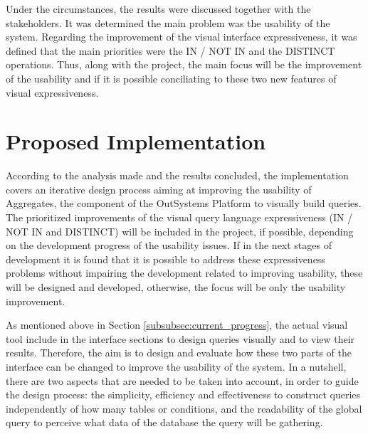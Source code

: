 Under the circumstances, the results were discussed together with the stakeholders. It was determined the main problem was the usability of the system. Regarding the improvement of the visual interface expressiveness, it was defined that the main priorities were the IN / NOT IN and the DISTINCT operations. Thus, along with the project, the main focus will be the improvement of the usability and if it is possible conciliating to these two new features of visual expressiveness.

\section{Proposed Implementation}
\label{sec:proposed_implementation}
According to the analysis made and the results concluded, the implementation covers an iterative design process aiming at improving the usability of Aggregates, the component of the OutSystems Platform to visually build queries. The prioritized improvements of the visual query language expressiveness (IN / NOT IN and DISTINCT) will be included in the project, if possible, depending on the development progress of the usability issues. If in the next stages of development it is found that it is possible to address these expressiveness problems without impairing the development related to improving usability, these will be designed and developed, otherwise, the focus will be only the usability improvement. %

As mentioned above in Section \ref{subsubsec:current_progress}, the actual visual tool include in the interface sections to design queries visually and to view their results. Therefore, the aim is to design and evaluate how these two parts of the interface can be changed to improve the usability of the system. In a nutshell, there are two aspects that are needed to be taken into account, in order to guide the design process: the simplicity, efficiency and effectiveness to construct queries independently of how many tables or conditions, and the readability of the global query to perceive what data of the database the query will be gathering.


